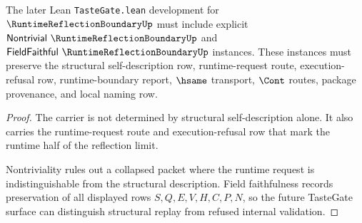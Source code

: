 \begin{theorem}
\label{thm:runtime-reflection-boundary-tastegate-obligation}
The later Lean \texttt{TasteGate.lean} development for $\RuntimeReflectionBoundaryUp$ must include explicit $\mathsf{Nontrivial}\ \RuntimeReflectionBoundaryUp$ and $\mathsf{FieldFaithful}\ \RuntimeReflectionBoundaryUp$ instances. These instances must preserve the structural self-description row, runtime-request route, execution-refusal row, runtime-boundary report, $\hsame$ transport, $\Cont$ routes, package provenance, and local naming row.
\end{theorem}
\begin{proof}
The carrier is not determined by structural self-description alone. It also carries the runtime-request route and execution-refusal row that mark the runtime half of the reflection limit.

Nontriviality rules out a collapsed packet where the runtime request is indistinguishable from the structural description. Field faithfulness records preservation of all displayed rows $S,Q,E,V,H,C,P,N$, so the future TasteGate surface can distinguish structural replay from refused internal validation.
\end{proof}





